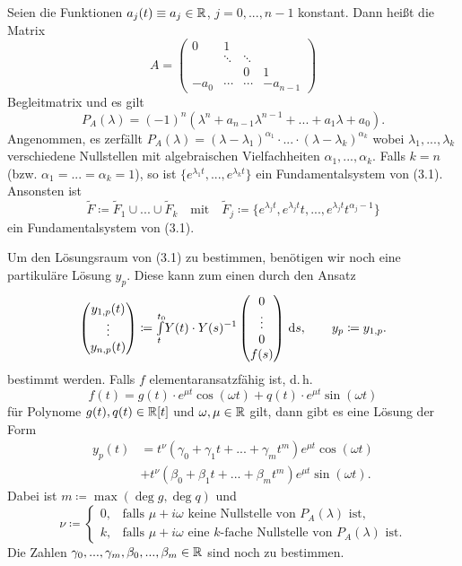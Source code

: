 \documentclass{cheat-sheet}
\begin{document}
\begin{bem}
  Seien die Funktionen $a_j(t) \equiv a_j \in \mathbb{R}$, $j = 0, ..., n-1$ konstant. Dann heißt die Matrix
  \[
    A = \begin{pmatrix}
      0 & 1 && \\
      & \ddots & \ddots & \\
      && 0 & 1\\
      - a_0 & \cdots & \cdots & -a_{n-1}
    \end{pmatrix}
  \]
  Begleitmatrix und es gilt
  \[ P_A(\lambda) = (-1)^n (\lambda^n + a_{n-1} \lambda^{n-1} + ... + a_1 \lambda + a_0). \]
  Angenommen, es zerfällt $P_A(\lambda) = (\lambda - \lambda_1)^{\alpha_1} \cdot ... \cdot (\lambda - \lambda_k)^{\alpha_k}$ wobei $\lambda_1, ..., \lambda_k$ verschiedene Nullstellen mit algebraischen Vielfachheiten $\alpha_1, ..., \alpha_k$.
  Falls $k = n$ (bzw. $\alpha_1 = ... = \alpha_k = 1$), so ist $\{ e^{\lambda_1 t}, ..., e^{\lambda_k t} \}$ ein Fundamentalsystem von (3.1). Ansonsten ist
  \[
    \tilde{F} \coloneqq \tilde{F}_1 \cup ... \cup \tilde{F}_k
    \quad \text{mit} \quad
    \tilde{F}_j \coloneqq \{ e^{\lambda_j t}, e^{\lambda_j t} t, ..., e^{\lambda_j t} t^{\alpha_j - 1} \}
  \]
  ein Fundamentalsystem von (3.1).
\end{bem}


\begin{bem}
  Um den Lösungsraum von (3.1) zu bestimmen, benötigen wir noch eine partikuläre Lösung $y_p$. Diese kann zum einen durch den Ansatz
  \[
    \begin{pmatrix}
      y_{1,p}(t)\\
      \vdots\\
      y_{n,p}(t)
    \end{pmatrix} \coloneqq {\textstyle \int\limits_{t}^{t_0}} Y(t) \cdot Y(s)^{-1} \begin{pmatrix}
      0\\ \vdots \\ 0 \\ f(s)
    \end{pmatrix} \,\mathrm{d} s, \qquad
    y_p \coloneqq y_{1,p}.
  \]
  bestimmt werden. Falls $f$ elementaransatzfähig ist, d.\,h.
  \[ f(t) = g(t) \cdot e^{\mu t} \cos(\omega t) + q(t) \cdot e^{\mu t} \sin(\omega t) \]
  für Polynome $g(t), q(t) \in \mathbb{R}[t]$ und $\omega, \mu \in \mathbb{R}$ gilt, dann gibt es eine Lösung der Form
  \begin{align*}
    y_p(t) &= t^{\nu} (\gamma_0 + \gamma_1 t + ... + \gamma_m t^m) e^{\mu t} \cos(\omega t)\\
    & + t^{\nu} (\beta_0 + \beta_1 t + ... + \beta_m t^m) e^{\mu t} \sin(\omega t).
  \end{align*}
  Dabei ist $m \coloneqq \max(\deg g, \deg q)$ und
  \[
    \nu \coloneqq \begin{cases}
      0, & \text{falls $\mu + i \omega$ keine Nullstelle von $P_A(\lambda)$ ist,}\\
      k, & \text{falls $\mu + i \omega$ eine $k$-fache Nullstelle von $P_A(\lambda)$ ist}.
    \end{cases}
  \]
  Die Zahlen $\gamma_0, ..., \gamma_m, \beta_0, ..., \beta_m \in \mathbb{R}$ sind noch zu bestimmen.
\end{bem}
\end{document}
